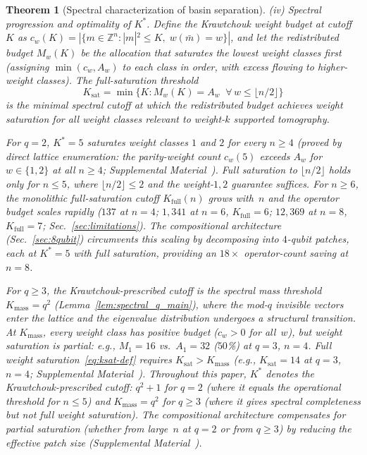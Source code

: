 \documentclass[twocolumn,prx,aps,superscriptaddress,longbibliography,floatfix]{revtex4-2}
\newtheorem{theorem}{Theorem}
\begin{document}
\begin{theorem}[Spectral characterization of basin separation]
\textup{(iv)} \emph{Spectral progression and optimality of $K^*$.}
Define the Krawtchouk weight budget at cutoff~$K$ as
$c_w(K) = |\{m \in \mathbb{Z}^n : |m|^2 \le K,\;
w(\bar{m}) = w\}|$, and let the \emph{redistributed
budget} $M_w(K)$ be the allocation that saturates the
lowest weight classes first (assigning $\min(c_w, A_w)$
to each class in order, with excess flowing to
higher-weight classes).
The \emph{full-saturation threshold}
\begin{equation}\label{eq:ksat-def}
  K_{\mathrm{sat}} = \min\bigl\{K : M_w(K) = A_w\;\;
  \forall\, w \le \lfloor n/2 \rfloor\bigr\}
\end{equation}
is the minimal spectral cutoff at which the redistributed
budget achieves weight saturation for all
weight classes relevant to weight-$k$ supported tomography.

For $q = 2$, $K^* = 5$ saturates weight classes $1$ and $2$ for
every $n \ge 4$ (proved by direct lattice enumeration:
the parity-weight count $c_w(5)$ exceeds $A_w$ for $w \in \{1,2\}$
at all $n \ge 4$; Supplemental Material~\cite{supplemental}).
Full saturation to $\lfloor n/2 \rfloor$ holds only for
$n \le 5$, where $\lfloor n/2 \rfloor \le 2$ and the
weight-$1,2$ guarantee suffices.
For $n \ge 6$, the monolithic full-saturation cutoff $K_{\mathrm{full}}(n)$
grows with~$n$ and the operator budget scales rapidly
($137$ at $n{=}4$; $1{,}341$ at $n{=}6$, $K_{\mathrm{full}}{=}6$;
$12{,}369$ at $n{=}8$, $K_{\mathrm{full}}{=}7$;
Sec.~\ref{sec:limitations}).
The compositional architecture (Sec.~\ref{sec:8qubit})
circumvents this scaling by decomposing into $4$-qubit patches,
each at $K^* = 5$ with full saturation, providing an $18\times$
operator-count saving at $n = 8$.

For $q \ge 3$, the Krawtchouk-prescribed cutoff is the
\emph{spectral mass threshold} $K_{\mathrm{mass}} = q^2$
(Lemma~\ref{lem:spectral_q_main}), where the mod-$q$
invisible vectors enter the lattice and the eigenvalue
distribution undergoes a structural transition.
At $K_{\mathrm{mass}}$, every weight class has positive
budget ($c_w > 0$ for all~$w$), but weight saturation
is partial: e.g., $M_1 = 16$ vs.\ $A_1 = 32$ ($50$\%) at
$q = 3$, $n = 4$.  Full weight saturation~\eqref{eq:ksat-def}
requires $K_{\mathrm{sat}} > K_{\mathrm{mass}}$ (e.g.,
$K_{\mathrm{sat}} = 14$ at $q = 3$, $n = 4$;
Supplemental Material~\cite{supplemental}).
Throughout this paper, $K^*$ denotes the Krawtchouk-prescribed
cutoff: $q^2 + 1$ for $q = 2$ (where it equals the operational
threshold for $n \le 5$) and $K_{\mathrm{mass}} = q^2$ for
$q \ge 3$ (where it gives spectral completeness but not full
weight saturation).
The compositional architecture compensates for partial
saturation (whether from large~$n$ at $q = 2$ or from $q \ge 3$)
by reducing the effective patch size
(Supplemental Material~\cite{supplemental}).


\end{theorem}
\end{document}
